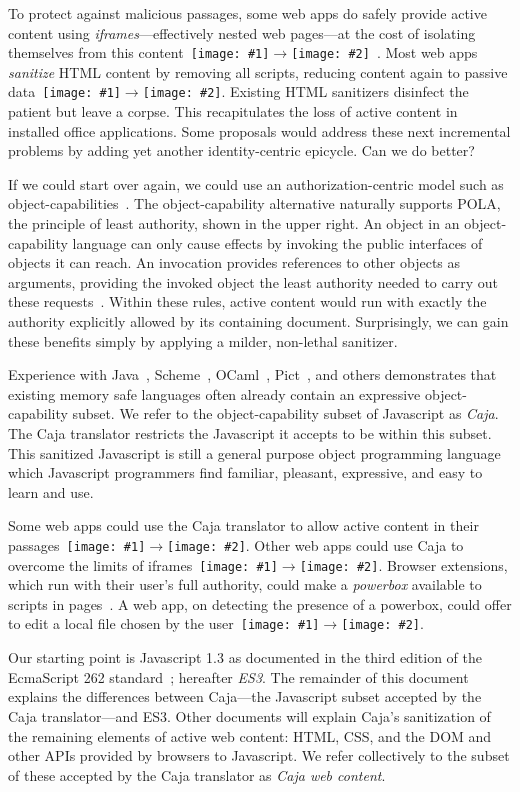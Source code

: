 \documentclass[letterpaper,twocolumn,10pt]{article}
\newcommand{\qq}[2]{{\texttt{[image: \#1]}}$\rightarrow${\texttt{[image: \#2]}}}
\begin{document}
To protect against malicious passages, some web apps do safely provide active 
content using \emph{iframes}---effectively nested web pages---at the cost of 
isolating themselves from this content~\qq{4}{3}~\cite{mashupos}. Most web 
apps \emph{sanitize} HTML content by removing all scripts, reducing content 
again to passive data~\qq{4}{1}. Existing HTML sanitizers disinfect the 
patient but leave a corpse. This recapitulates the loss of active content in 
installed office applications. Some proposals would address these next 
incremental problems by adding yet another identity-centric epicycle. Can we 
do better?

If we could start over again, we could use an authorization-centric model 
such as object-capabilities~\cite{DVH}. The object-capability alternative 
naturally supports POLA, the principle of least authority, shown in the upper 
right. An object in an object-capability language can only cause effects by 
invoking the public interfaces of objects it can reach. An invocation 
provides references to other objects as arguments, providing the invoked 
object the least authority needed to carry out these 
requests~\cite{RobustComposition}. Within these rules, active content would 
run with exactly the authority explicitly allowed by its containing document. 
Surprisingly, we can gain these benefits simply by applying a milder, 
non-lethal sanitizer.

Experience with Java~\cite{joe-e}, Scheme~\cite{rees96security}, 
OCaml~\cite{emily}, Pict~\cite{backwater}, and others demonstrates that 
existing memory safe languages often already contain an expressive 
object-capability subset. We refer to the object-capability subset of 
Javascript as \emph{Caja}. The Caja translator restricts the Javascript it 
accepts to be within this subset. This sanitized Javascript is still a 
general purpose object programming language which Javascript programmers find 
familiar, pleasant, expressive, and easy to learn and use.

Some web apps could use the Caja translator to allow active content in their 
passages~\qq{4}{5}. Other web apps could use Caja to overcome the limits of 
iframes~\qq{3}{5}. Browser extensions, which run with their user's full 
authority, could make a \emph{powerbox} available to scripts in 
pages~\cite{darpareview, stiegler:polaris, seaborn:plash, bitfrost}. A web 
app, on detecting the presence of a powerbox, could offer to edit a local 
file chosen by the user~\qq{2}{6}.

Our starting point is Javascript 1.3 as documented in the third edition of 
the EcmaScript 262 standard~\cite{ECMA-262}; hereafter \emph{ES3}. The 
remainder of this document explains the differences between Caja---the 
Javascript subset accepted by the Caja translator---and ES3. Other documents 
will explain Caja's sanitization of the remaining elements of active web 
content: HTML, CSS, and the DOM and other APIs provided by browsers to 
Javascript. We refer collectively to the subset of these accepted by the 
Caja translator as \emph{Caja web content}.
\end{document}
